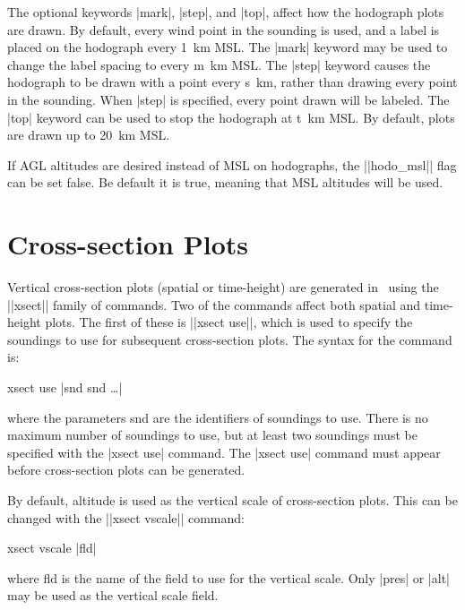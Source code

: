 The optional keywords |mark|, |step|, and |top|, affect how the hodograph 
plots are drawn.  By default, every wind point in the sounding is used, and
a label is placed on the hodograph every 1~km MSL.  The |mark| keyword
may be used to change the label spacing to every {\pf m}~km MSL.
The |step| keyword causes the hodograph to be drawn with a point every 
{\pf s}~km, rather than drawing every point in the sounding.  When
|step| is specified, every point drawn will be labeled.  The |top| keyword can
be used to stop the hodograph at {\pf t}~km MSL.  By default, plots
are drawn up to 20~km MSL.

If AGL altitudes are desired instead of MSL on hodographs, the ||hodo_msl||
flag can be set false.  Be default it is true, meaning that MSL altitudes
will be used.

\section{Cross-section Plots}
Vertical cross-section plots (spatial or time-height) are generated in \suds\
using the ||xsect|| family of commands.  Two of the commands affect both
spatial and time-height plots.  The first of these is ||xsect use||, which
is used to specify the soundings to use for subsequent cross-section plots.
The syntax for the command is:
\begin{example}
	xsect use |snd snd \ldots|
\end{example}
where the parameters {\pf snd} are the identifiers of soundings to use.
There is no maximum number of soundings to use, but at least two soundings
must be specified with the |xsect use| command.  The |xsect use| command must
appear before cross-section plots can be generated.

By default, altitude is used as the vertical scale of cross-section plots.
This can be changed with the ||xsect vscale|| command:
\begin{example}
	xsect vscale |fld|
\end{example}
where {\pf fld} is the name of the field to use for the vertical scale.
Only |pres| or |alt| may be used as the vertical scale field.

